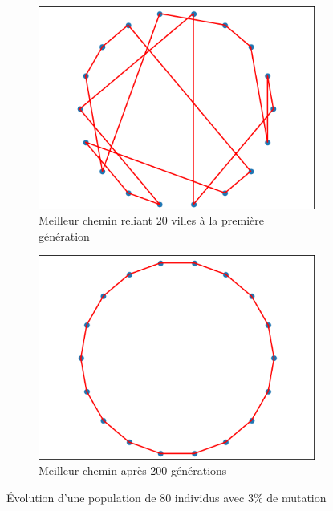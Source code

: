 \documentclass[12pt]{article}
\begin{document}
\begin{figure}[h]
    \begin{subfigure}{.5\textwidth}
        \includegraphics[width=.9\linewidth]{./gen1.png}
        \caption{Meilleur chemin reliant 20 villes à la première génération}
    \end{subfigure}
    \begin{subfigure}{.5\textwidth}
        \includegraphics[width=.9\linewidth]{./gen200.png}
        \caption{Meilleur chemin après 200 générations
        }
    \end{subfigure}
    \caption{Évolution d'une population de 80 individus avec 3\% de mutation}
\end{figure}
\end{document}
